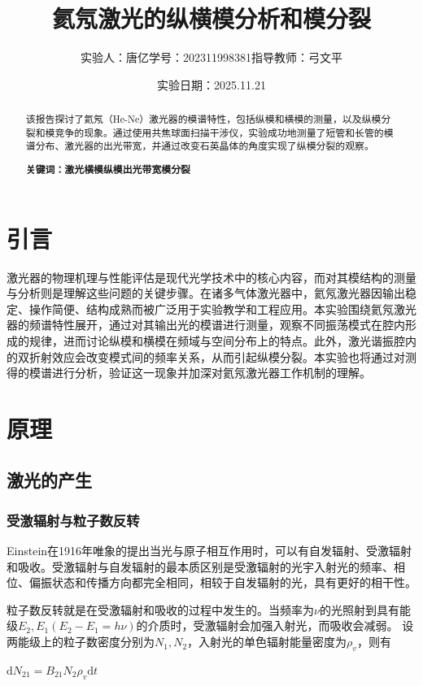 \documentclass[a4paper, 1.5lines]{ctexart}
\title{氦氖激光的纵横模分析和模分裂}
\author{实验人：唐亿\qquad 学号：202311998381\qquad 指导教师：弓文平}
\date{实验日期：2025.11.21}
\begin{document}
    
    \maketitle
    
    \begin{abstract}
         该报告探讨了氦氖（He-Ne）激光器的模谱特性，包括纵模和横模的测量，以及纵模分裂和模竞争的现象。通过使用共焦球面扫描干涉仪，实验成功地测量了短管和长管的模谱分布、激光器的出光带宽，并通过改变石英晶体的角度实现了纵模分裂的观察。
        
         \textbf{\textbf{关键词：激光\quad 横模\quad 纵模\quad 出光带宽\quad 模分裂}}
    \end{abstract}
    
    \section{引言}
        激光器的物理机理与性能评估是现代光学技术中的核心内容，而对其模结构的测量与分析则是理解这些问题的关键步骤。在诸多气体激光器中，氦氖激光器因输出稳定、操作简便、结构成熟而被广泛用于实验教学和工程应用。本实验围绕氦氖激光器的频谱特性展开，通过对其输出光的模谱进行测量，观察不同振荡模式在腔内形成的规律，进而讨论纵模和横模在频域与空间分布上的特点。此外，激光谐振腔内的双折射效应会改变模式间的频率关系，从而引起纵模分裂。本实验也将通过对测得的模谱进行分析，验证这一现象并加深对氦氖激光器工作机制的理解。
    \section{原理}
        \subsection{激光的产生}
            \subsubsection{受激辐射与粒子数反转}
            Einstein在1916年唯象的提出当光与原子相互作用时，可以有自发辐射、受激辐射和吸收。受激辐射与自发辐射的最本质区别是受激辐射的光宇入射光的频率、相位、偏振状态和传播方向都完全相同，相较于自发辐射的光，具有更好的相干性。

            粒子数反转就是在受激辐射和吸收的过程中发生的。当频率为$\nu$的光照射到具有能级$E_2,E_1(E_2-E_1 = h\nu)$的介质时，受激辐射会加强入射光，而吸收会减弱。
            设两能级上的粒子数密度分别为$N_1,N_2$，入射光的单色辐射能量密度为$\rho_v$，则有

            \centerline{$\mathrm{d}N_{21} = B_{21} N_2 \rho_v \mathrm{d}t$}
\end{document}
